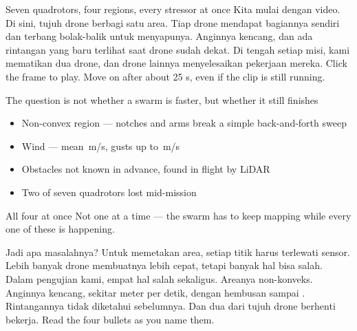 \documentclass[aspectratio=169,11pt,t]{beamer}
\begin{document}
\begin{frame}{Seven quadrotors, four regions, every stressor at once}
  \centering
    {Kita mulai dengan video. Di sini, tujuh drone berbagi satu area. Tiap drone mendapat bagiannya sendiri dan terbang bolak-balik untuk menyapunya. Anginnya kencang, dan ada rintangan yang baru terlihat saat drone sudah dekat. Di tengah setiap misi, kami mematikan dua drone, dan drone lainnya menyelesaikan pekerjaan mereka.}
    {Click the frame to play. Move on after about 25 s, even if the clip is still running.}
\end{frame}

\begin{frame}{The question is not whether a swarm is faster, but whether it still finishes}
  \begin{itemize}\bulletgap
    \item Non-convex region --- notches and arms break a simple back-and-forth sweep
    \item Wind --- mean \WindMeanMag\,m/s, gusts up to \WindMaxH\,m/s
    \item Obstacles not known in advance, found in flight by LiDAR
    \item Two of seven quadrotors lost mid-mission
  \end{itemize}
  \vfill
  \begin{callout}{All four at once}
    Not one at a time --- the swarm has to keep mapping while every one of
    these is happening.
  \end{callout}
    {Jadi apa masalahnya? Untuk memetakan area, setiap titik harus terlewati sensor. Lebih banyak drone membuatnya lebih cepat, tetapi banyak hal bisa salah. Dalam pengujian kami, empat hal salah sekaligus. Areanya non-konveks. Anginnya kencang, sekitar \WindMeanMag\space meter per detik, dengan hembusan sampai \WindMaxH. Rintangannya tidak diketahui sebelumnya. Dan dua dari tujuh drone berhenti bekerja.}
    {Read the four bullets as you name them.}
\end{frame}
\end{document}
